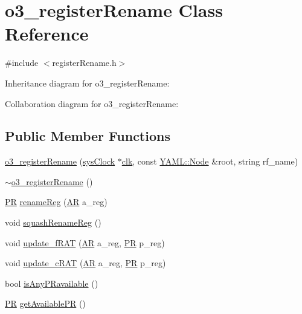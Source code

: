 \hypertarget{classo3__registerRename}{
\section{o3\_\-registerRename Class Reference}
\label{classo3__registerRename}
}


{\ttfamily \#include $<$registerRename.h$>$}



Inheritance diagram for o3\_\-registerRename:


Collaboration diagram for o3\_\-registerRename:
\subsection*{Public Member Functions}
\begin{DoxyCompactItemize}
\item 
\hyperlink{classo3__registerRename_aa3a055c1f55180203cf49d3907bb7bde}{o3\_\-registerRename} (\hyperlink{classsysClock}{sysClock} $\ast$\hyperlink{g__objs_8h_afc4784c140eed1743728e83840e91c12}{clk}, const \hyperlink{classYAML_1_1Node}{YAML::Node} \&root, string rf\_\-name)
\item 
\hyperlink{classo3__registerRename_ad8e4b3165b84c89ba73d622c58f8b65f}{$\sim$o3\_\-registerRename} ()
\item 
\hyperlink{global_2global_8h_a54dcae2ba04c76c12afe113b706bd4dc}{PR} \hyperlink{classo3__registerRename_a1e65eca8eb066cf294a056d015469992}{renameReg} (\hyperlink{global_2global_8h_a735ca3cb7fa17e60af6701a846722516}{AR} a\_\-reg)
\item 
void \hyperlink{classo3__registerRename_a72f6bb205743c3bbbe41c47584208c90}{squashRenameReg} ()
\item 
void \hyperlink{classo3__registerRename_ac29d3ca88b64d065d8f52b4384895c4b}{update\_\-fRAT} (\hyperlink{global_2global_8h_a735ca3cb7fa17e60af6701a846722516}{AR} a\_\-reg, \hyperlink{global_2global_8h_a54dcae2ba04c76c12afe113b706bd4dc}{PR} p\_\-reg)
\item 
void \hyperlink{classo3__registerRename_af8f4e3c178f20fbee9a17d5781cd8f84}{update\_\-cRAT} (\hyperlink{global_2global_8h_a735ca3cb7fa17e60af6701a846722516}{AR} a\_\-reg, \hyperlink{global_2global_8h_a54dcae2ba04c76c12afe113b706bd4dc}{PR} p\_\-reg)
\item 
bool \hyperlink{classo3__registerRename_a500dec17b068c33a1813786cb6727273}{isAnyPRavailable} ()
\item 
\hyperlink{global_2global_8h_a54dcae2ba04c76c12afe113b706bd4dc}{PR} \hyperlink{classo3__registerRename_a314a54fa930b7fa3de55c8b66e46061b}{getAvailablePR} ()

\end{DoxyCompactItemize}
